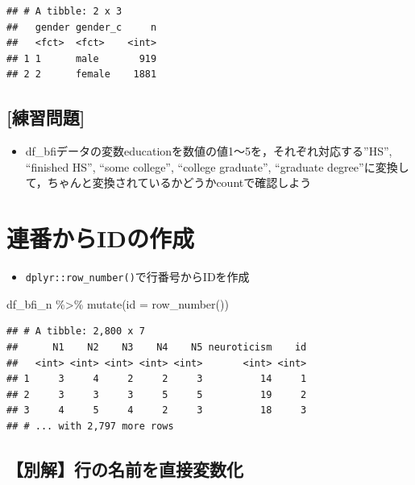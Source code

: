 \documentclass[
  xelatex,ja=standard, b5paper]{bxjsbook}
\newenvironment{Shaded}{\begin{snugshade}}{\end{snugshade}}
\newcommand{\AttributeTok}[1]{\textcolor[rgb]{0.77,0.63,0.00}{#1}}
\newcommand{\FunctionTok}[1]{\textcolor[rgb]{0.00,0.00,0.00}{#1}}
\newcommand{\NormalTok}[1]{#1}
\newcommand{\SpecialCharTok}[1]{\textcolor[rgb]{0.00,0.00,0.00}{#1}}
\providecommand{\tightlist}{%
  \setlength{\itemsep}{0pt}\setlength{\parskip}{0pt}}
\begin{document}
\begin{verbatim}
## # A tibble: 2 x 3
##   gender gender_c     n
##   <fct>  <fct>    <int>
## 1 1      male       919
## 2 2      female    1881
\end{verbatim}

\hypertarget{ux7df4ux7fd2ux554fux984c-12}{%
\subsection{{[}練習問題{]}}\label{ux7df4ux7fd2ux554fux984c-12}}

\begin{itemize}
\tightlist
\item
  df\_bfiデータの変数educationを数値の値1～5を，それぞれ対応する''HS'', ``finished HS'', ``some college'', ``college graduate'', ``graduate degree''に変換して，ちゃんと変換されているかどうかcountで確認しよう
\end{itemize}

\hypertarget{mu-seq}{%
\section{連番からIDの作成}\label{mu-seq}}

\begin{itemize}
\tightlist
\item
  \texttt{dplyr::row\_number()}で行番号からIDを作成
\end{itemize}

\begin{Shaded}
\begin{Highlighting}[]
\NormalTok{df\_bfi\_n }\SpecialCharTok{\%\textgreater{}\%} 
  \FunctionTok{mutate}\NormalTok{(}\AttributeTok{id =} \FunctionTok{row\_number}\NormalTok{())}
\end{Highlighting}
\end{Shaded}

\begin{verbatim}
## # A tibble: 2,800 x 7
##      N1    N2    N3    N4    N5 neuroticism    id
##   <int> <int> <int> <int> <int>       <int> <int>
## 1     3     4     2     2     3          14     1
## 2     3     3     3     5     5          19     2
## 3     4     5     4     2     3          18     3
## # ... with 2,797 more rows
\end{verbatim}

\hypertarget{mu-seq-other}{%
\subsection{【別解】行の名前を直接変数化}\label{mu-seq-other}}
\end{document}
